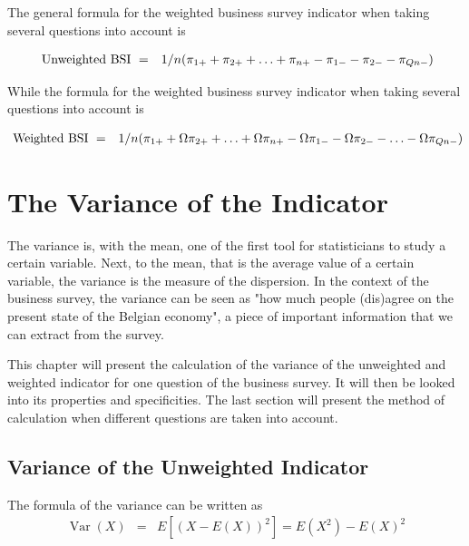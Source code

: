 \documentclass[12pt,a4paper,oneside]{book}
\DeclareMathOperator{\Var}{Var}
\begin{document}
The general formula for the weighted business survey indicator when taking several questions into account is

\begin{eqnarray}
    \mbox{ Unweighted BSI}\ &=& 1/n ( \pi_{1+} +  \pi_{2+} + \ldots +  \pi_{n+}  -  \pi_{1-} -  \pi_{2-} -  \pi_{Qn-} \Large) 
\end{eqnarray}

While the formula for the weighted business survey indicator when taking several questions into account is

\begin{eqnarray}
    \mbox{ Weighted BSI}\ &=& 1/n ( \pi_{1+} + \Omega \pi_{2+} + \ldots + \Omega \pi_{n+} - \Omega \pi_{1-} - \Omega \pi_{2-} - \ldots - \Omega \pi_{Qn-} \Large) \nonumber\\
\end{eqnarray}

\chapter{The Variance of the Indicator}

The variance is, with the mean, one of the first tool for statisticians to study a certain variable. 
Next, to the mean, that is the average value of a certain variable, the variance is the measure of the dispersion. 
In the context of the business survey, the variance can be seen as "how much people (dis)agree on the present state of the Belgian economy", a piece of important information that we can extract from the survey.


This chapter will present the calculation of the variance of the unweighted and weighted indicator for one question of the business survey. It will then be looked into its properties and specificities.
The last section will present the method of calculation when different questions are taken into account.

\section{Variance of the Unweighted Indicator}

\nocite{alcaniz_calculation_2006}

The formula of the variance can be written as 
\begin{eqnarray}
         \Var(X) &=& E \left[ \left(X-E(X) \right)^2 \right] =  E\left( X^2\right) - E\left( X\right)^2
\end{eqnarray}
\end{document}
